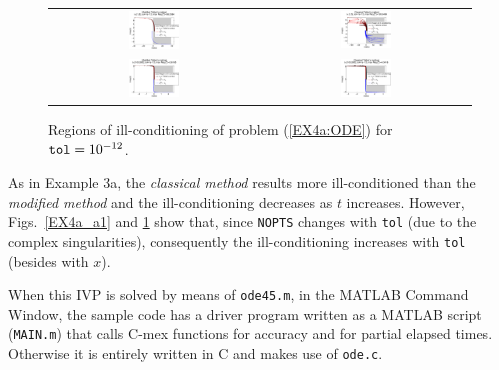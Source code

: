 \documentclass[a4paper,10pt]{report}%
\begin{document}
\begin{figure}[htb]
\centering
\begin{tabular}{cc}
\includegraphics[width=0.25\textwidth]{./FIGS/EX4a/EX4a_illcond_tol4_t1_Talbot1.eps} &
\includegraphics[width=0.25\textwidth]{./FIGS/EX4a/EX4a_illcond_tol4_t1_Talbot2.eps} \\
\includegraphics[width=0.25\textwidth]{./FIGS/EX4a/EX4a_illcond_tol4_t100_Talbot1.eps} &
\includegraphics[width=0.25\textwidth]{./FIGS/EX4a/EX4a_illcond_tol4_t100_Talbot2.eps}
\end{tabular}
\caption{\small Regions of ill-conditioning of problem (\ref{EX4a:ODE}) for ${\tt tol}=10^{-12}$.}
\label{EX4a_a2}
\end{figure}

\noindent As in Example 3a, the {\em classical method} results more ill-conditioned than the {\em modified method}
and the ill-conditioning decreases as $t$ increases.
However, Figs.~\ref{EX4a_a1} and \ref{EX4a_a2} show that, since {\tt NOPTS} changes with {\tt tol} (due to the
complex singularities), consequently the ill-conditioning increases with {\tt tol} (besides with $x$).

When this IVP is solved by means of {\tt ode45.m}, in the MATLAB Command Window, the sample code has a driver
program written as a MATLAB script ({\tt MAIN.m}) that calls C-mex functions for accuracy and for partial
elapsed times.
Otherwise it is entirely written in C and makes use of {\tt ode.c}.
\end{document}
